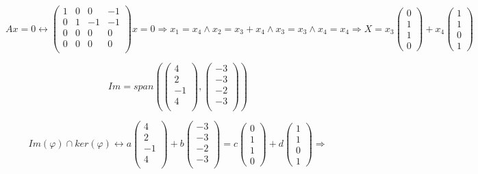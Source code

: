 \documentclass[a4paper,12pt]{article}
\begin{document}
\[
Ax = 0 \leftrightarrow
\begin{pmatrix}
    1& 0& 0& -1 \\
    0& 1& -1& -1 \\
    0& 0& 0& 0\\
    0& 0& 0& 0\\
\end{pmatrix} x = 0 \Rightarrow x_1 = x_4 \land x_2 = x_3 + x_4  \land x_3 = x_3 \land x_4 = x_4\Rightarrow
    X = x_3\begin{pmatrix}
        0 \\ 1 \\ 1 \\ 0
    \end{pmatrix} + x_4 \begin{pmatrix}
        1 \\ 1 \\ 0 \\ 1
    \end{pmatrix}
\]

\[
Im = span\left(\begin{pmatrix}
    4\\
    2\\
    -1\\
    4\\
\end{pmatrix}, \begin{pmatrix}
    -3 \\
    -3 \\
    -2 \\
    -3 \\
\end{pmatrix}\right)
\]

\[
Im(\varphi) \cap ker(\varphi) \leftrightarrow a\begin{pmatrix}
    4\\
    2\\
    -1\\
    4\\
\end{pmatrix} + b\begin{pmatrix}
    -3 \\
    -3 \\
    -2 \\
    -3 \\
\end{pmatrix} = c \begin{pmatrix}
        0 \\ 1 \\ 1 \\ 0
    \end{pmatrix} + d \begin{pmatrix}
        1 \\ 1 \\ 0 \\ 1
    \end{pmatrix} \Rightarrow 
\]
\end{document}
